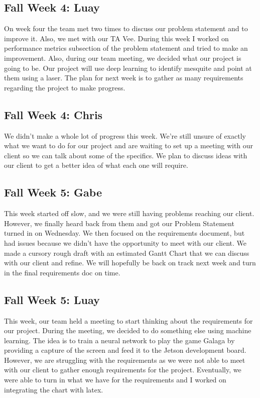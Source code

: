 \documentclass[onecolumn, draftclsnofoot,10pt, compsoc]{IEEEtran}
\begin{document}
\subsection{Fall Week 4: Luay}
On week four the team met two times to discuss our problem statement and to improve it. Also, we met with our TA Vee. During this week I worked on performance metrics subsection of the problem statement and tried to make an improvement. Also, during our team meeting, we decided what our project is going to be. Our project will use deep learning to identify mesquite and point at them using a laser. The plan for next week is to gather as many requirements regarding the project to make progress.
\subsection{Fall Week 4: Chris}
We didn't make a whole lot of progress this week. We're still unsure of exactly what we want to do for our project and are waiting to set up a meeting with our client so we can talk about some of the specifics. We plan to discuss ideas with our client to get a better idea of what each one will require.
\subsection{Fall Week 5: Gabe}
This week started off slow, and we were still having problems reaching our client. However, we finally heard back from them and got our Problem Statement turned in on Wednesday. We then focused on the requirements document, but had issues because we didn't have the opportunity to meet with our client. We made a cursory rough draft with an estimated Gantt Chart that we can discuss with our client and refine. We will hopefully be back on track next week and turn in the final requirements doc on time.
\subsection{Fall Week 5: Luay}
This week, our team held a meeting to start thinking about the requirements for our project. During the meeting, we decided to do something else using machine learning. The idea is to train a neural network to play the game Galaga by providing a capture of the screen and feed it to the Jetson development board. However, we are struggling with the requirements as we were not able to meet with our client to gather enough requirements for the project. Eventually, we were able to turn in what we have for the requirements and I worked on integrating the chart with latex.
\end{document}
